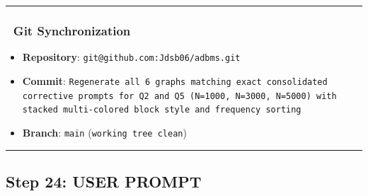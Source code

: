 \documentclass[11pt,a4paper]{article}
\begin{document}
\hrule


\subsubsection{🐙 Git Synchronization}
\begin{itemize}
\item \textbf{Repository}: \texttt{git@github.com:Jdsb06/adbms.git}
\item \textbf{Commit}: \texttt{Regenerate all 6 graphs matching exact consolidated corrective prompts for Q2 and Q5 (N=1000, N=3000, N=5000) with stacked multi-colored block style and frequency sorting}
\item \textbf{Branch}: \texttt{main} (\texttt{working tree clean})
\end{itemize}

\hrule

\subsection{Step 24: USER PROMPT}
\end{document}
